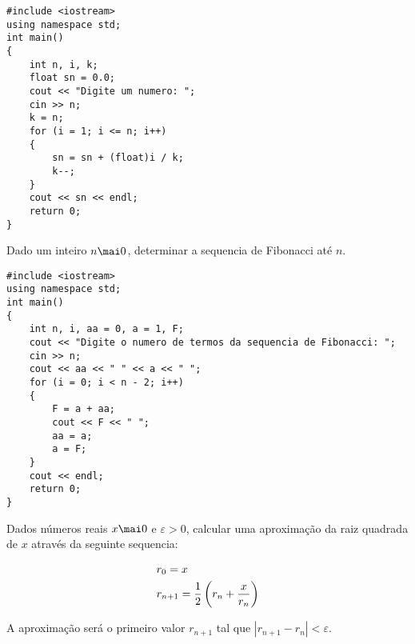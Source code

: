 \documentclass[a4paper]{memoir}
\begin{document}
\begin{sol}
\begin{lstlisting}
#include <iostream>
using namespace std;
int main()
{
    int n, i, k;
    float sn = 0.0;
    cout << "Digite um numero: ";
    cin >> n;
    k = n;
    for (i = 1; i <= n; i++)
    {
        sn = sn + (float)i / k;
        k--;
    }
    cout << sn << endl;
    return 0;
}
\end{lstlisting}
\end{sol}

\begin{ex}[Fibonacci]
Dado um inteiro $n \mai 0$, determinar a sequencia de Fibonacci até $n$.
\end{ex}

\begin{sol}
\begin{lstlisting}
#include <iostream>
using namespace std;
int main()
{
    int n, i, aa = 0, a = 1, F;
    cout << "Digite o numero de termos da sequencia de Fibonacci: ";
    cin >> n;
    cout << aa << " " << a << " ";
    for (i = 0; i < n - 2; i++)
    {
        F = a + aa;
        cout << F << " ";
        aa = a;
        a = F;
    }
    cout << endl;
    return 0;
}
\end{lstlisting}
\end{sol}

\begin{prob}\label{prob204.cpp}
Dados números reais $x \mai 0$ e $\varepsilon > 0$, calcular uma aproximação da raiz quadrada de $x$ através da seguinte sequencia:

\[
\begin{gathered}
  r_0 = x \hfill \\
  r_{n + 1} = \frac{1}{2}\left( r_n + \frac{x}{r_n} \right) \hfill \\
\end{gathered}
\]

A aproximação será o primeiro valor $r_{n + 1}$ tal que $|r_{n + 1} - r_n| < \varepsilon$.
\end{prob}
\end{document}
